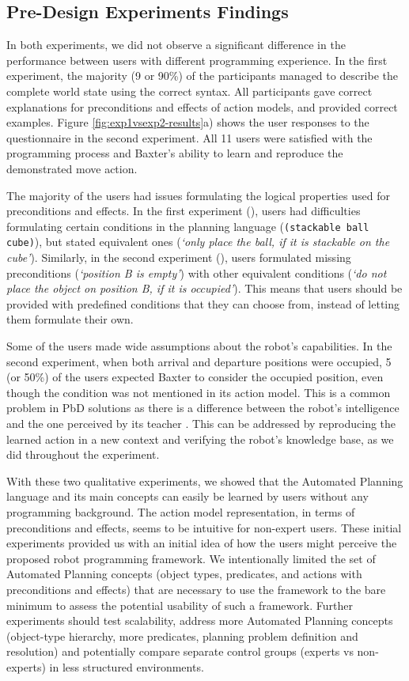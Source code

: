 \subsection{Pre-Design Experiments Findings}
In both experiments, we did not observe a significant difference in the performance between users with different programming experience. 
In the first experiment, the majority (9 or 90\%) of the participants managed to describe the complete world state using the correct syntax.
All participants gave correct explanations for preconditions and effects of action models, and provided correct examples.
Figure \ref{fig:exp1vsexp2-results}a) shows the user responses to the questionnaire in the second experiment.
All 11 users were satisfied with the programming process and Baxter's ability to learn and reproduce the demonstrated move action. 

The majority of the users had issues formulating the logical properties used for preconditions and effects. 
In the first experiment (), users had difficulties formulating certain conditions in the planning language (\eg \texttt{(stackable ball cube)}), but stated equivalent ones (\eg \textit{`only place the ball, if it is stackable on the cube'}).
Similarly, in the second experiment (), users formulated missing preconditions (\eg \textit{`position B is empty'}) with other equivalent conditions (\eg \textit{`do not place the object on position B, if it is occupied'}). 
This means that users should be provided with predefined conditions that they can choose from, instead of letting them formulate their own.

Some of the users made wide assumptions about the robot's capabilities. 
In the second experiment, when both arrival and departure positions were occupied, 5 (or 50\%) of the users expected Baxter to consider the occupied position, even though the condition was not mentioned in its action model.
This is a common problem in PbD solutions as there is a difference between the robot's intelligence and the one perceived by its teacher \cite{suay2012practical}.
This can be addressed by reproducing the learned action in a new context and verifying the robot's knowledge base, as we did throughout the experiment.

With these two qualitative experiments, we showed that the Automated Planning language and its main concepts can easily be learned by users without any programming background. 
The action model representation, in terms of preconditions and effects, seems to be intuitive for non-expert users. 
These initial experiments provided us with an initial idea of how the users might perceive the proposed robot programming framework. 
We intentionally limited the set of Automated Planning concepts (\ie object types, predicates, and actions with preconditions and effects) that are necessary to use the framework to the bare minimum to assess the potential usability of such a framework. 
Further experiments should test scalability, address more Automated Planning concepts (\eg object-type hierarchy, more predicates, planning problem definition and resolution) and potentially compare separate control groups (\eg experts vs non-experts) in less structured environments.

